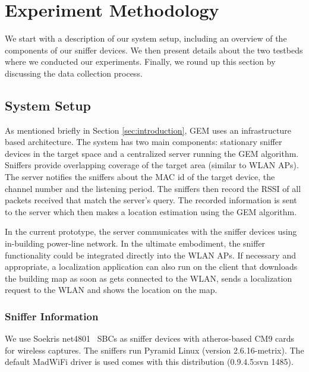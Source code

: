 \section{Experiment Methodology}
\label{sec:experimentmethodology}

We start with a description of our system setup, including an overview of the components of our sniffer devices. We then present details about the two testbeds where we conducted our experiments. Finally, we round up this section by discussing the data collection process.

\subsection{System Setup}
\label{subsec:systemsetup}

As mentioned briefly in Section \ref{sec:introduction}, GEM uses an infrastructure based
architecture. The system has two main components: stationary sniffer devices in the target space and a centralized server running the GEM algorithm. Sniffers provide overlapping coverage of the target area (similar to WLAN APs). The server notifies the sniffers about the MAC id of the target device, the channel number and the listening period. The sniffers then record the RSSI of all packets received that match the server's query. The recorded information is sent to the server which then makes a location estimation using the GEM algorithm.

In the current prototype, the server communicates with the sniffer devices using in-building power-line network. In the ultimate embodiment, the sniffer functionality could be integrated directly into the WLAN APs. If necessary and appropriate, a localization application can also run on the client that downloads the building map as soon as gets connected to the WLAN, sends a localization request to the WLAN and shows the location on the map. 

\subsubsection{Sniffer Information}
\label{subsec:snifferinformation}


We use Soekris net4801~\cite{} SBCs as sniffer
devices with atheros-based CM9 cards for wireless captures. The sniffers run Pyramid Linux (version 2.6.16-metrix). The default
MadWiFi driver is used comes with this distribution (0.9.4.5:svn 1485). 

